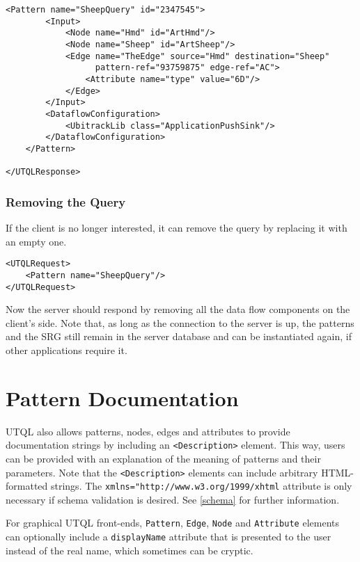\documentclass[11pt]{article}
\begin{document}
\begin{Verbatim}[fontsize=\footnotesize,tabsize=2]
    <Pattern name="SheepQuery" id="2347545">
        <Input>
            <Node name="Hmd" id="ArtHmd"/>
            <Node name="Sheep" id="ArtSheep"/>
            <Edge name="TheEdge" source="Hmd" destination="Sheep"
                  pattern-ref="93759875" edge-ref="AC">
                <Attribute name="type" value="6D"/>
            </Edge>
        </Input>
        <DataflowConfiguration>
            <UbitrackLib class="ApplicationPushSink"/>
        </DataflowConfiguration>
    </Pattern>

</UTQLResponse>
\end{Verbatim} 

\subsubsection{Removing the Query}

If the client is no longer interested, it
can remove the query by replacing it with an empty one. 

\begin{Verbatim}[fontsize=\footnotesize,tabsize=2] 
<UTQLRequest>
	<Pattern name="SheepQuery"/>
</UTQLRequest>
\end{Verbatim} 

Now the server should respond by removing all the data flow components on the
client's side. Note that, as long as the connection to the server is up, the
patterns and the SRG still remain in the server database and can be
instantiated again, if other applications require it. 

\section{Pattern Documentation}
\label{self-documentation}

UTQL also allows patterns, nodes, edges and attributes to provide documentation strings by including an \texttt{<Description>} element. This way, users can be provided with an explanation of the meaning of patterns and their parameters. Note that the \texttt{<Description>} elements can include arbitrary HTML-formatted strings. The \texttt{xmlns="http://www.w3.org/1999/xhtml} attribute is only necessary if schema validation is desired. See \ref{schema} for further information.

For graphical UTQL front-ends, \texttt{Pattern}, \texttt{Edge}, \texttt{Node} and \texttt{Attribute} elements can optionally include a \texttt{displayName} attribute that is presented to the user instead of the real name, which sometimes can be cryptic.
\end{document}
